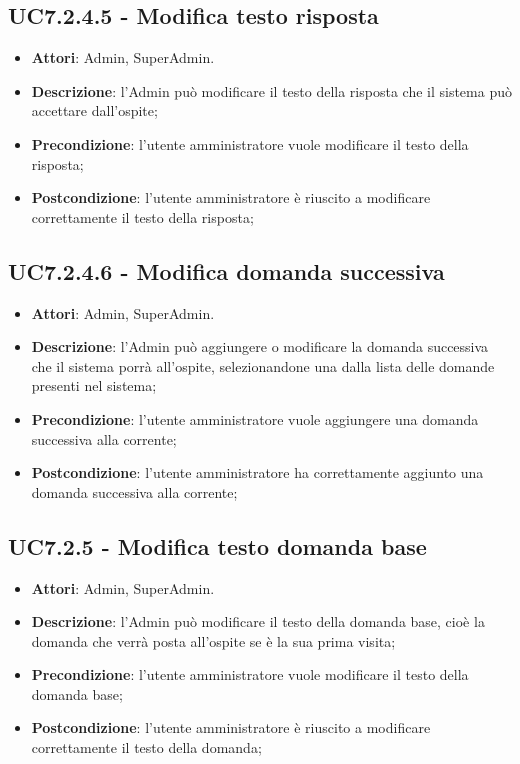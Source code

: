 \documentclass[../AnalisiDeiRequisiti.tex]{subfiles}
\begin{document}
\subsection{UC7.2.4.5 - Modifica testo risposta} 
\label{sssec:UC7.2.4.5} 
\begin{itemize} 
\item \textbf{Attori}: Admin, SuperAdmin.
\item \textbf{Descrizione}: l'Admin può modificare il testo della risposta che il sistema può accettare dall'ospite;
\item \textbf{Precondizione}: l'utente amministratore vuole modificare il testo della risposta;
\item \textbf{Postcondizione}: l'utente amministratore è riuscito a modificare correttamente il testo della risposta;
\end{itemize} 
\subsection{UC7.2.4.6 - Modifica domanda successiva} 
\label{sssec:UC7.2.4.6} 
\begin{itemize} 
\item \textbf{Attori}: Admin, SuperAdmin.
\item \textbf{Descrizione}: l'Admin può aggiungere o modificare la domanda successiva che il sistema porrà all'ospite, selezionandone una dalla lista delle domande presenti nel sistema;
\item \textbf{Precondizione}: l'utente amministratore vuole aggiungere una domanda successiva alla corrente;
\item \textbf{Postcondizione}: l'utente amministratore ha correttamente aggiunto una domanda successiva alla corrente;
\end{itemize} 
\subsection{UC7.2.5 - Modifica testo domanda base} 
\label{sssec:UC7.2.5} 
\begin{itemize} 
\item \textbf{Attori}: Admin, SuperAdmin.
\item \textbf{Descrizione}: l'Admin può modificare il testo della domanda base, cioè la domanda che verrà posta all'ospite se è la sua prima visita;
\item \textbf{Precondizione}: l'utente amministratore vuole modificare il testo della domanda base;
\item \textbf{Postcondizione}: l'utente amministratore è riuscito a modificare correttamente il testo della domanda;
\end{itemize} 
\end{document}
